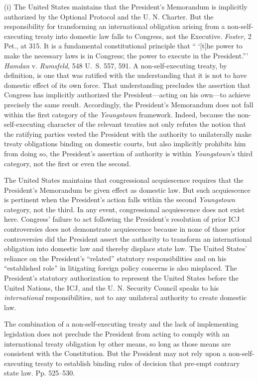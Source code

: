   (i) The United States maintains that the President's Memorandum is
implicitly authorized by the Optional Protocol and the U. N. Charter.
But the responsibility for transforming an international obligation
arising from a non-self-executing treaty into domestic law falls
to Congress, not the Executive. \emph{Foster,} 2 Pet., at 315. It
is a fundamental constitutional principle that `` ‘[t]he power
to make the necessary laws is in Congress; the power to execute in
the President.''' \emph{Hamdan} v. \emph{Rumsfeld,} 548 U.~S. 557,
591. A non-self-executing treaty, by defini\newpage tion, is one that
was ratified with the understanding that it is not to have domestic
effect of its own force. That understanding precludes the assertion
that Congress has implicitly authorized the President---acting on
his own---to achieve precisely the same result. Accordingly, the
President's Memorandum does not fall within the first category of
the \emph{Youngstown} framework. Indeed, because the non-self-executing
character of the relevant treaties not only refutes the notion that
the ratifying parties vested the President with the authority to
unilaterally make treaty obligations binding on domestic courts, but
also implicitly prohibits him from doing so, the President's assertion
of authority is within \emph{Youngstown}'s third category, not the first
or even the second.

  The United States maintains that congressional acquiescence requires
that the President's Memorandum be given effect as domestic law. But
such acquiescence is pertinent when the President's action falls
within the second \emph{Youngstown} category, not the third. In any
event, congressional acquiescence does not exist here. Congress'
failure to act following the President's resolution of prior ICJ
controversies does not demonstrate acquiescence because in none of
those prior controversies did the President assert the authority to
transform an international obligation into domestic law and thereby
displace state law. The United States' reliance on the President's
``related'' statutory responsibilities and on his ``established
role'' in litigating foreign policy concerns is also misplaced. The
President's statutory authorization to represent the United States
before the United Nations, the ICJ, and the U. N. Security Council
speaks to his \emph{international} responsibilities, not to any unilateral
authority to create domestic law.

  The combination of a non-self-executing treaty and the lack of
implementing legislation does not preclude the President from acting to
comply with an international treaty obligation by other means, so long
as those means are consistent with the Constitution. But the President
may not rely upon a non-self-executing treaty to establish binding rules
of decision that pre-empt contrary state law. Pp. 525--530.

